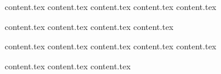 \documentclass[letterpaper,11pt]{article}
\theoremstyle{mytheorem}
\begin{document}
{content.tex} \clearpage\newpage
{content.tex} \clearpage\newpage
{content.tex} \clearpage\newpage
{content.tex} \clearpage\newpage
{content.tex} \clearpage\newpage

{content.tex} \clearpage\newpage
{content.tex} \clearpage\newpage
{content.tex} \clearpage\newpage
{content.tex} \clearpage\newpage

{content.tex} \clearpage\newpage
{content.tex} \clearpage\newpage
{content.tex} \clearpage\newpage
{content.tex} \clearpage\newpage
{content.tex} \clearpage\newpage

{content.tex} \clearpage\newpage
{content.tex} \clearpage\newpage
{content.tex} \clearpage\newpage
\end{document}

